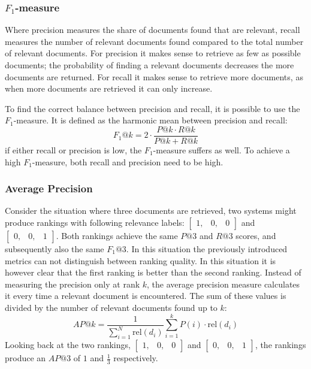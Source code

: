 \subsubsection{$F_1$-measure}
Where precision measures the share of documents found that are relevant, recall measures the number of relevant documents found compared to the total number of relevant documents. For precision it makes sense to retrieve as few as possible documents; the probability of finding a relevant documents decreases the more documents are returned. For recall it makes sense to retrieve more documents, as when more documents are retrieved it can only increase.  

To find the correct balance between precision and recall, it is possible to use the $F_1$-measure. It is defined as the harmonic mean between precision and recall:
\begin{equation}
	\textit{F}_1@\textit{k}  = 2\cdot\frac{P@k \cdot R@k}{P@k + R@k} 
\end{equation}
if either recall or precision is low, the $F_1$-measure suffers as well. To achieve a high $F_1$-measure, both recall and precision need to be high.

\subsubsection{Average Precision}
Consider the situation where three documents are retrieved, two systems might produce rankings with following relevance labels: $\left[
\begin{smallmatrix}
	1, & 0, & 0
\end{smallmatrix}
\right]$ and $\left[
\begin{smallmatrix}
	0, & 0, & 1
\end{smallmatrix}
\right]$.
Both rankings achieve the same $P@3$ and $R@3$ scores, and subsequently also the same $F_1@3$. In this situation the previously introduced metrics can not distinguish between ranking quality. In this situation it is however clear that the first ranking is better than the second ranking. 
Instead of measuring the precision only at rank $k$, the average precision measure calculates it every time a relevant document is encountered. The sum of these values is divided by the number of relevant documents found up to $k$:
\begin{equation}
	\textit{AP}@k = \frac{1}{\sum_{i=1}^N\text{rel}\left(d_i\right)}\sum^k_{i=1} P\left(i\right) \cdot \text{rel}\left(d_i\right)
\end{equation}
Looking back at the two rankings, 
$\left[
\begin{smallmatrix}
	1, & 0, & 0
\end{smallmatrix}
\right]$ and $\left[
\begin{smallmatrix}
	0, & 0, & 1
\end{smallmatrix}
\right]$, the rankings produce an $\textit{AP}@3$ of $1$ and $\frac{1}{3}$ respectively.


